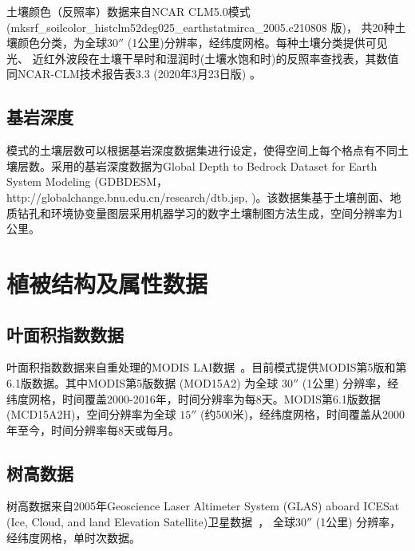 土壤颜色（反照率）数据来自NCAR CLM5.0模式(mksrf\_soilcolor\-\_histclm52deg025\-\_earthstatmirca\-\_2005.c210808 版)，
共20种土壤颜色分类，为全球$30''$ (1公里)分辨率，经纬度网格。每种土壤分类提供可见光、
近红外波段在土壤干旱时和湿润时(土壤水饱和时)的反照率查找表，其数值同NCAR-CLM技术报告表3.3 (2020年3月23日版) \citep{lawrence2018}。


\subsection{基岩深度}\label{基岩深度}

模式的土壤层数可以根据基岩深度数据集进行设定，使得空间上每个格点有不同土壤层数。采用的基岩深度数据为Global Depth to Bedrock Dataset for Earth System Modeling (GDBDESM，http://globalchange.bnu.edu.cn/research/dtb.jsp, \citet{shangguan2017mapping})。该数据集基于土壤剖面、地质钻孔和环境协变量图层采用机器学习的数字土壤制图方法生成，空间分辨率为1公里。


\section{植被结构及属性数据}\label{植被结构及属性数据}
\subsection{叶面积指数数据}\label{叶面积指数数据}
叶面积指数数据来自重处理的MODIS LAI数据~\citep{yuan20143d}。目前模式提供MODIS第5版和第6.1版数据。其中MODIS第5版数据 (MOD15A2) 为全球 $30''$ (1公里) 分辨率，经纬度网格，时间覆盖2000-2016年，时间分辨率为每8天。MODIS第6.1版数据 (MCD15A2H)，空间分辨率为全球 $15''$ (约500米)，经纬度网格，时间覆盖从2000年至今，时间分辨率每8天或每月。

\subsection{树高数据}\label{树高数据}
树高数据来自2005年Geoscience Laser Altimeter System (GLAS) aboard ICESat 
(Ice, Cloud, and land Elevation Satellite)卫星数据~\citep{simard2011mapping}，
全球$30''$ (1公里) 分辨率，经纬度网格，单时次数据。

